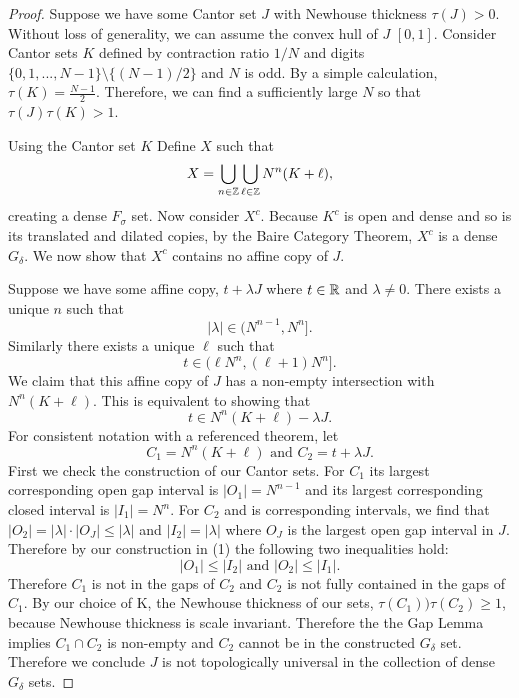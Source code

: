 \begin{proof} Suppose we have some Cantor set $J$ with Newhouse thickness $\tau(J) >0$. Without loss of generality, we  can assume  the convex hull of $J$ $[0,1]$.   Consider Cantor sets $K$ defined by contraction ratio $1/N$ and digits $\{0,1,...,N-1\}\setminus\{(N-1)/2\}$ and $N$ is odd. By a simple calculation,  $\tau (K) = \frac{N-1}{2}$. Therefore,  we can find a  sufficiently large $N$ so that $\tau(J)\tau(K)>1$. 

\medskip

Using the Cantor set $K$ Define $X$ such that $$
X = \bigcup_{n \in \mathbb{Z}} \bigcup_{\ell \in \mathbb{Z}} N^n(K+\ell),
$$creating a dense $F_\sigma$ set. Now consider $X^c$.  Because $K^c$ is open and dense and so is its translated and dilated copies, by the Baire Category Theorem, $X^c$ is a dense $G_{\delta}$.  We now show that $X^c$ contains no affine copy of $J$. 

\medskip

Suppose we have some affine copy, $t+ \lambda J$ where $t\in\mathbb{R}$ and $\lambda\ne 0$. There exists a unique $n$ such that 
\begin{equation}
    |\lambda| \in (N^{n-1}, N^n].
\end{equation}
Similarly there exists a unique $\ell$ such that 
\begin{equation}
t \in (\ell  N^n, (\ell+1)N^n].    
\end{equation}
We claim that this affine copy of $J$ has a non-empty intersection with $N^n(K+\ell)$.  This is equivalent to  showing that 
$$t \in N^n(K+\ell)-\lambda J.$$
For consistent notation with a referenced theorem, let 
$$C_1 = N^n(K+\ell) \text{ and } C_2 = t+ \lambda J.$$
First we check the construction of our Cantor sets. For $C_1$ its largest corresponding open gap interval is $|O_1| = N^{n-1}$ and its largest corresponding closed interval is $|I_1| = N^n$. For $C_2$ and is corresponding intervals, we find that $|O_2| =|\lambda|\cdot |O_J| \le |\lambda|$ and $|I_2| = |\lambda|$ where $O_J$ is the largest  open gap interval in $J$.  Therefore by our construction in (1) the following two inequalities hold: $$|O_1|\leq |I_2| \text { and } |O_2| \leq |I_1|.$$ Therefore $C_1$ is not in the gaps of $C_2$ and $C_2$ is not fully contained in the gaps of $C_1$.  By our choice of K, the Newhouse thickness of our sets, $\tau(C_1))\tau(C_2) \geq 1$, because Newhouse thickness is scale invariant.  Therefore the the Gap Lemma implies $C_1 \cap C_2$ is non-empty and $C_2$ cannot be in the constructed $G_{\delta} $ set. Therefore we conclude $J$ is not topologically universal in the collection of dense $G_\delta$ sets.  



\end{proof}
